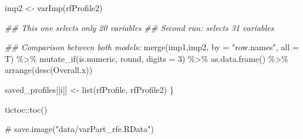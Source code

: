 \documentclass[
  letterpaper,
  DIV=11,
  numbers=noendperiod]{scrartcl}
\newenvironment{Shaded}{\begin{snugshade}}{\end{snugshade}}
\newcommand{\AttributeTok}[1]{\textcolor[rgb]{0.40,0.45,0.13}{#1}}
\newcommand{\CommentTok}[1]{\textcolor[rgb]{0.37,0.37,0.37}{#1}}
\newcommand{\DecValTok}[1]{\textcolor[rgb]{0.68,0.00,0.00}{#1}}
\newcommand{\DocumentationTok}[1]{\textcolor[rgb]{0.37,0.37,0.37}{\textit{#1}}}
\newcommand{\FunctionTok}[1]{\textcolor[rgb]{0.28,0.35,0.67}{#1}}
\newcommand{\NormalTok}[1]{\textcolor[rgb]{0.00,0.23,0.31}{#1}}
\newcommand{\OtherTok}[1]{\textcolor[rgb]{0.00,0.23,0.31}{#1}}
\newcommand{\SpecialCharTok}[1]{\textcolor[rgb]{0.37,0.37,0.37}{#1}}
\newcommand{\StringTok}[1]{\textcolor[rgb]{0.13,0.47,0.30}{#1}}
\begin{document}
\begin{Shaded}
\begin{Highlighting}[]
\NormalTok{imp2 }\OtherTok{\textless{}{-}} \FunctionTok{varImp}\NormalTok{(rfProfile2)}


\DocumentationTok{\#\# This one selects only 20 variables}
\DocumentationTok{\#\# Second run: selects 31 variables}

\DocumentationTok{\#\# Comparison between both models:}
\FunctionTok{merge}\NormalTok{(imp1,imp2, }\AttributeTok{by =} \StringTok{"row.names"}\NormalTok{, }\AttributeTok{all =}\NormalTok{ T) }\SpecialCharTok{\%\textgreater{}\%} 
    \FunctionTok{mutate\_if}\NormalTok{(is.numeric, round, }\AttributeTok{digits =} \DecValTok{3}\NormalTok{) }\SpecialCharTok{\%\textgreater{}\%}
    \FunctionTok{as.data.frame}\NormalTok{() }\SpecialCharTok{\%\textgreater{}\%}
    \FunctionTok{arrange}\NormalTok{(}\FunctionTok{desc}\NormalTok{(Overall.x))}

\NormalTok{saved\_profiles[[i]] }\OtherTok{\textless{}{-}} \FunctionTok{list}\NormalTok{(rfProfile, rfProfile2)}
\NormalTok{\}}

\NormalTok{tictoc}\SpecialCharTok{::}\FunctionTok{toc}\NormalTok{()}

\CommentTok{\# save.image("data/varPart\_rfe.RData")}
\end{Highlighting}
\end{Shaded}
\end{document}
